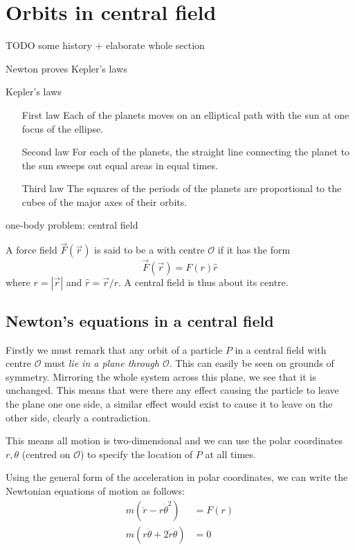 \section{Orbits in central field}
TODO some history + elaborate whole section

Newton proves Kepler's laws
\begin{eigenschap}
Kepler's laws
\begin{enumerate}
\item[First law] Each of the planets moves on an elliptical path with the sun at one focus of the ellipse.
\item[Second law] For each of the planets, the straight line connecting the planet to the sun sweeps out equal areas in equal times.
\item[Third law] The squares of the periods of the planets are proportional to the cubes of the major axes of their orbits.
\end{enumerate}
\end{eigenschap}

one-body problem: central field
\begin{definition}
A force field $\vec{F}(\vec{r})$ is said to be a  with centre $\mathcal{O}$ if it has the form
\[ \vec{F}(\vec{r}) = F(r) \hat{r} \]
where $r = |\vec{r}|$ and $\hat{r} = \vec{r}/r$. A central field is thus  about its centre.
\end{definition}

\subsection{Newton's equations in a central field}
Firstly we must remark that any orbit of a particle $P$ in a central field with centre $\mathcal{O}$ must \emph{lie in a plane through $\mathcal{O}$}. This can easily be seen on grounds of symmetry. Mirroring the whole system across this plane, we see that it is unchanged. This means that were there any effect causing the particle to leave the plane one one side, a similar effect would exist to cause it to leave on the other side, clearly a contradiction.

This means all motion is two-dimensional and we can use the polar coordinates $r,\theta$ (centred on $\mathcal{O}$) to specify the location of $P$ at all times.

Using the general form of the acceleration in polar coordinates, we can write the Newtonian equations of motion as follows:
\begin{align*}
m \left(\ddot{r}-r \dot{\theta}^2\right) &= F(r) \\
m \left(r \ddot{\theta} + 2 \dot{r} \dot{\theta}\right) &= 0
\end{align*}


